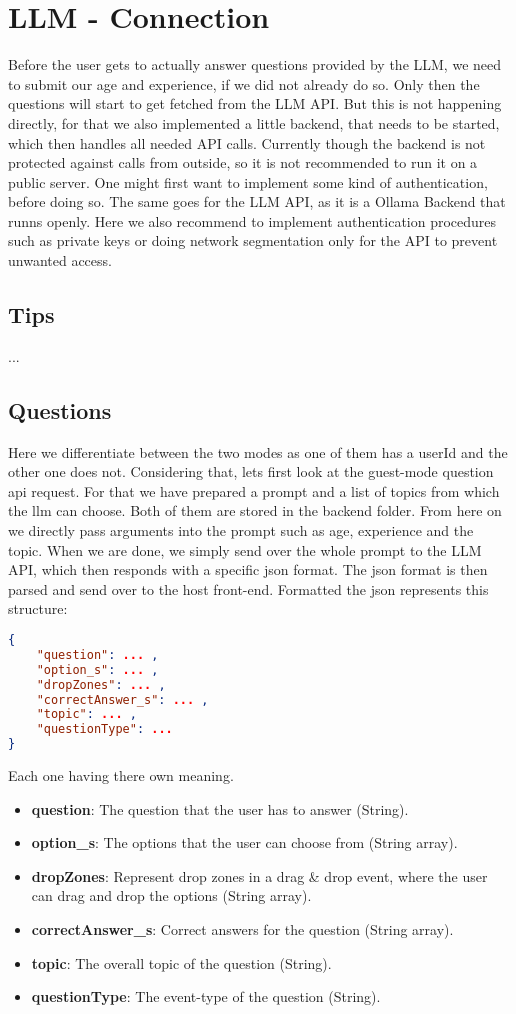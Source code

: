 \section{LLM - Connection}
Before the user gets to actually answer questions provided by the LLM, we need to submit our age and experience, if we did not already do so.
Only then the questions will start to get fetched from the LLM API.
But this is not happening directly, for that we also implemented a little backend, that needs to be started, which then handles all needed API calls.
Currently though the backend is not protected against calls from outside, so it is not recommended to run it on a public server.
One might first want to implement some kind of authentication, before doing so. 
The same goes for the LLM API, as it is a Ollama Backend that runns openly.
Here we also recommend to implement authentication procedures such as private keys or doing network segmentation only for the API to prevent unwanted access.

\subsection{Tips}
...

\subsection{Questions}
Here we differentiate between the two modes as one of them has a userId and the other one does not.
Considering that, lets first look at the guest-mode question api request.
For that we have prepared a prompt and a list of topics from which the llm can choose.
Both of them are stored in the backend folder.
From here on we directly pass arguments into the prompt such as age, experience and the topic.
When we are done, we simply send over the whole prompt to the LLM API, which then responds with a specific json format.
The json format is then parsed and send over to the host front-end.
Formatted the json represents this structure:
\begin{lstlisting}[language=json,firstnumber=1]
{
    "question": ... ,
    "option_s": ... ,
    "dropZones": ... ,
    "correctAnswer_s": ... ,
    "topic": ... ,
    "questionType": ...
}
\end{lstlisting}
Each one having there own meaning.
\begin{itemize}
    \item \textbf{question}: The question that the user has to answer (String).
    \item \textbf{option\_s}: The options that the user can choose from (String array).
    \item \textbf{dropZones}: Represent drop zones in a drag \& drop event, where the user can drag and drop the options (String array).
    \item \textbf{correctAnswer\_s}: Correct answers for the question (String array).
    \item \textbf{topic}: The overall topic of the question (String).
    \item \textbf{questionType}: The event-type of the question (String).
\end{itemize}

